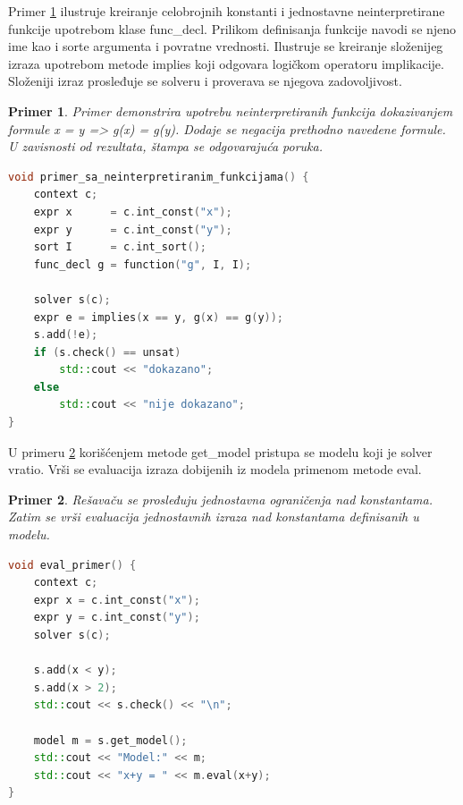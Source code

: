 \documentclass[12pt,oneside]{memoir}
\newtheorem{primer}{Primer}
\begin{document}
Primer \ref{ex2} ilustruje kreiranje celobrojnih konstanti i jednostavne neinterpretirane funkcije upotrebom klase func\_decl. Prilikom definisanja funkcije navodi se njeno ime kao i sorte argumenta i povratne vrednosti. Ilustruje se kreiranje složenijeg izraza upotrebom metode implies koji odgovara logičkom operatoru implikacije. Složeniji izraz prosleđuje se solveru i proverava se njegova zadovoljivost.
\begin{primer} \label{ex2} Primer demonstrira upotrebu neinterpretiranih funkcija dokazivanjem formule x = y => g(x) = g(y). Dodaje se negacija prethodno navedene formule. U zavisnosti od rezultata, štampa se odgovarajuća poruka.\\
\begin{lstlisting}[language=C++]
void primer_sa_neinterpretiranim_funkcijama() { 
    context c;
    expr x      = c.int_const("x");
    expr y      = c.int_const("y");
    sort I      = c.int_sort();
    func_decl g = function("g", I, I);
    
    solver s(c);
    expr e = implies(x == y, g(x) == g(y));
    s.add(!e);
    if (s.check() == unsat) 
        std::cout << "dokazano";
    else
        std::cout << "nije dokazano";
}
\end{lstlisting}
\end{primer}


U primeru \ref{ex3} korišćenjem metode get\_model pristupa se modelu koji je solver vratio. Vrši se evaluacija izraza dobijenih iz modela primenom metode eval.  
\begin{primer} \label{ex3} Rešavaču se prosleđuju jednostavna ograničenja nad konstantama. Zatim se vrši evaluacija jednostavnih izraza nad konstantama definisanih u modelu.
\begin{lstlisting}[language=C++]
void eval_primer() {
    context c;
    expr x = c.int_const("x");
    expr y = c.int_const("y");
    solver s(c);

    s.add(x < y);
    s.add(x > 2);
    std::cout << s.check() << "\n";
    
    model m = s.get_model();
    std::cout << "Model:" << m;
    std::cout << "x+y = " << m.eval(x+y);
}
\end{lstlisting}
\end{primer}
\end{document}
